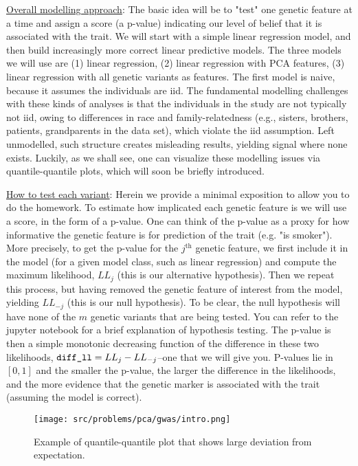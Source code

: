 \documentclass[preview]{standalone}
\begin{document}
\underline{Overall modelling approach}: The basic idea will be to "test" one genetic feature at a time and assign a score (a p-value) indicating our level of belief that it is associated with the trait. We will start with a simple linear regression model, and then build increasingly more correct linear predictive models. The three models we will use are (1) linear regression, (2) linear regression with PCA features, (3) linear regression with all genetic variants as features. The first model is naive, because it assumes the individuals are iid. The fundamental modelling challenges with these kinds of analyses is that the individuals in the study are not typically not iid, owing to differences in race and family-relatedness (e.g., sisters, brothers, patients, grandparents in the data set), which violate the iid assumption. Left unmodelled, such structure creates misleading results, yielding signal where none exists. Luckily, as we shall see, one can visualize these modelling issues via quantile-quantile plots, which will soon be briefly introduced.

\underline{How to test each variant}:
Herein we provide a minimal exposition to allow you to do the homework. To estimate how implicated each genetic feature is we will use a score, in the form of a p-value. One can think of the p-value as a proxy for how informative the genetic feature is for prediction of the trait (e.g. "is smoker"). More precisely, to get the p-value for the $j^{\text{th}}$ genetic feature, we first include it in the model (for a given model class, such as linear regression) and compute the maximum likelihood, $LL_{j}$ (this is our alternative hypothesis). Then we repeat this process, but having removed the genetic feature of interest from the model, yielding $LL_{-j}$ (this is our null hypothesis). To be clear, the null hypothesis will have none of the $m$ genetic variants that are being tested. You can refer to the jupyter notebook for a brief explanation of hypothesis testing. The p-value is then a simple monotonic decreasing function of the difference in these two likelihoods, $ \verb|diff_ll|=LL_j - LL_{-j}$--one that we will give you. P-values lie in $[0,1]$ and the smaller the p-value, the larger the difference in the likelihoods, and the more evidence that the genetic marker is associated with the trait (assuming the model is correct).

\begin{figure}
	\centering
	\texttt{[image: src/problems/pca/gwas/intro.png]}
	\caption{Example of quantile-quantile plot that shows large deviation from expectation.}
	\label{fig:intro}
\end{figure}
\end{document}
